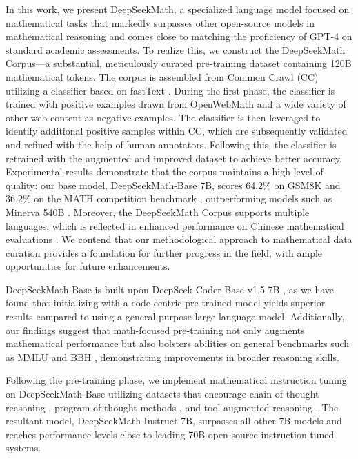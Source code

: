 In this work, we present DeepSeekMath, a specialized language model focused on mathematical tasks that markedly surpasses other open-source models in mathematical reasoning and comes close to matching the proficiency of GPT-4 on standard academic assessments. To realize this, we construct the DeepSeekMath Corpus—a substantial, meticulously curated pre-training dataset containing 120B mathematical tokens. The corpus is assembled from Common Crawl (CC) utilizing a classifier based on fastText \citep{joulin2016fasttext}. During the first phase, the classifier is trained with positive examples drawn from OpenWebMath \citep{openwebmath} and a wide variety of other web content as negative examples. The classifier is then leveraged to identify additional positive samples within CC, which are subsequently validated and refined with the help of human annotators. Following this, the classifier is retrained with the augmented and improved dataset to achieve better accuracy. Experimental results demonstrate that the corpus maintains a high level of quality: our base model, DeepSeekMath-Base 7B, scores 64.2\% on GSM8K \citep{gsm8k} and 36.2\% on the MATH competition benchmark \citep{MATH}, outperforming models such as Minerva 540B \citep{minerva}. Moreover, the DeepSeekMath Corpus supports multiple languages, which is reflected in enhanced performance on Chinese mathematical evaluations \citep{wei2023cmath,agieval}. We contend that our methodological approach to mathematical data curation provides a foundation for further progress in the field, with ample opportunities for future enhancements.

DeepSeekMath-Base is built upon DeepSeek-Coder-Base-v1.5 7B \citep{deepseek-coder}, as we have found that initializing with a code-centric pre-trained model yields superior results compared to using a general-purpose large language model. Additionally, our findings suggest that math-focused pre-training not only augments mathematical performance but also bolsters abilities on general benchmarks such as MMLU \citep{mmlu} and BBH \citep{bbh}, demonstrating improvements in broader reasoning skills.

Following the pre-training phase, we implement mathematical instruction tuning on DeepSeekMath-Base utilizing datasets that encourage chain-of-thought reasoning \citep{cot}, program-of-thought methods \citep{pot,pal}, and tool-augmented reasoning \citep{tora}. The resultant model, DeepSeekMath-Instruct 7B, surpasses all other 7B models and reaches performance levels close to leading 70B open-source instruction-tuned systems.

